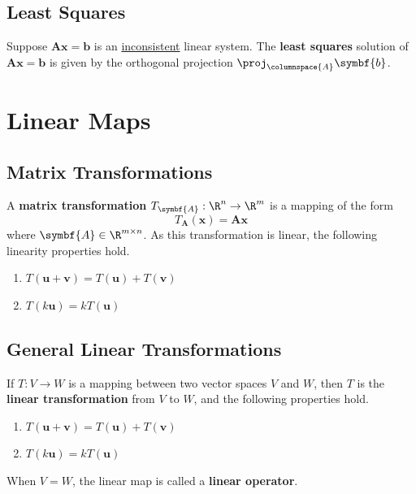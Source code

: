 \documentclass{article}
\begin{document}
\subsection{Least Squares}
\begin{theorem}
    Suppose \(\symbf{A}\symbf{x}=\symbf{b}\) is an
    \underline{inconsistent} linear system. The \textbf{least squares}
    solution of \(\symbf{A}\symbf{x}=\symbf{b}\) is given by the
    orthogonal projection \(\proj_{\columnspace{A}}\symbf{b}\).
\end{theorem}
\section{Linear Maps}
\subsection{Matrix Transformations}
\begin{definition}
    A \textbf{matrix transformation}
    \(T_{\symbf{A}}:\R^n\rightarrow \R^m\) is a
    mapping of the form
    \begin{equation*}
        T_{\symbf{A}}\left(\symbf{x}\right) = \symbf{A}\symbf{x}
    \end{equation*}
    where \(\symbf{A}\in \R^{m \times n}\). As this
    transformation is linear, the following linearity properties hold.
    \begin{enumerate}
        \item \(T\left(\symbf{u}+\symbf{v}\right)=T\left(\symbf{u}\right) + T\left(\symbf{v}\right)\)
        \item \(T\left(k\symbf{u}\right)= kT\left(\symbf{u}\right)\)
    \end{enumerate}
\end{definition}
\subsection{General Linear Transformations}
\begin{theorem}
    If \(T: V \rightarrow W\) is a mapping between two vector spaces
    \(V\) and \(W\), then \(T\) is the \textbf{linear transformation}
    from \(V\) to \(W\), and the following properties hold.
    \begin{enumerate}
        \item \(T\left(\symbf{u}+\symbf{v}\right)=T\left(\symbf{u}\right) + T\left(\symbf{v}\right)\)
        \item \(T\left(k\symbf{u}\right) = kT\left(\symbf{u}\right)\)
    \end{enumerate}
\end{theorem}
\begin{theorem}
    When \(V=W\), the linear map is called a \textbf{linear operator}.
\end{theorem}
\end{document}
